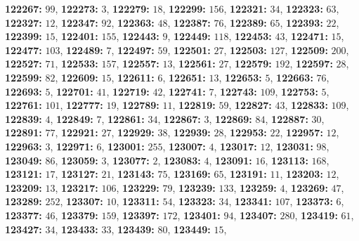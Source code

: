 \textsf{\bfseries 122267:} $99$, \textsf{\bfseries 122273:} $3$, \textsf{\bfseries 122279:} $18$, \textsf{\bfseries 122299:} $156$, \textsf{\bfseries 122321:} $34$, \textsf{\bfseries 122323:} $63$, \textsf{\bfseries 122327:} $12$, \textsf{\bfseries 122347:} $92$, \textsf{\bfseries 122363:} $48$, \textsf{\bfseries 122387:} $76$, \textsf{\bfseries 122389:} $65$, \textsf{\bfseries 122393:} $22$, \textsf{\bfseries 122399:} $15$, \textsf{\bfseries 122401:} $155$, \textsf{\bfseries 122443:} $9$, \textsf{\bfseries 122449:} $118$, \textsf{\bfseries 122453:} $43$, \textsf{\bfseries 122471:} $15$, \textsf{\bfseries 122477:} $103$, \textsf{\bfseries 122489:} $7$, \textsf{\bfseries 122497:} $59$, \textsf{\bfseries 122501:} $27$, \textsf{\bfseries 122503:} $127$, \textsf{\bfseries 122509:} $200$, \textsf{\bfseries 122527:} $71$, \textsf{\bfseries 122533:} $157$, \textsf{\bfseries 122557:} $13$, \textsf{\bfseries 122561:} $27$, \textsf{\bfseries 122579:} $192$, \textsf{\bfseries 122597:} $28$, \textsf{\bfseries 122599:} $82$, \textsf{\bfseries 122609:} $15$, \textsf{\bfseries 122611:} $6$, \textsf{\bfseries 122651:} $13$, \textsf{\bfseries 122653:} $5$, \textsf{\bfseries 122663:} $76$, \textsf{\bfseries 122693:} $5$, \textsf{\bfseries 122701:} $41$, \textsf{\bfseries 122719:} $42$, \textsf{\bfseries 122741:} $7$, \textsf{\bfseries 122743:} $109$, \textsf{\bfseries 122753:} $5$, \textsf{\bfseries 122761:} $101$, \textsf{\bfseries 122777:} $19$, \textsf{\bfseries 122789:} $11$, \textsf{\bfseries 122819:} $59$, \textsf{\bfseries 122827:} $43$, \textsf{\bfseries 122833:} $109$, \textsf{\bfseries 122839:} $4$, \textsf{\bfseries 122849:} $7$, \textsf{\bfseries 122861:} $34$, \textsf{\bfseries 122867:} $3$, \textsf{\bfseries 122869:} $84$, \textsf{\bfseries 122887:} $30$, \textsf{\bfseries 122891:} $77$, \textsf{\bfseries 122921:} $27$, \textsf{\bfseries 122929:} $38$, \textsf{\bfseries 122939:} $28$, \textsf{\bfseries 122953:} $22$, \textsf{\bfseries 122957:} $12$, \textsf{\bfseries 122963:} $3$, \textsf{\bfseries 122971:} $6$, \textsf{\bfseries 123001:} $255$, \textsf{\bfseries 123007:} $4$, \textsf{\bfseries 123017:} $12$, \textsf{\bfseries 123031:} $98$, \textsf{\bfseries 123049:} $86$, \textsf{\bfseries 123059:} $3$, \textsf{\bfseries 123077:} $2$, \textsf{\bfseries 123083:} $4$, \textsf{\bfseries 123091:} $16$, \textsf{\bfseries 123113:} $168$, \textsf{\bfseries 123121:} $17$, \textsf{\bfseries 123127:} $21$, \textsf{\bfseries 123143:} $75$, \textsf{\bfseries 123169:} $65$, \textsf{\bfseries 123191:} $11$, \textsf{\bfseries 123203:} $12$, \textsf{\bfseries 123209:} $13$, \textsf{\bfseries 123217:} $106$, \textsf{\bfseries 123229:} $79$, \textsf{\bfseries 123239:} $133$, \textsf{\bfseries 123259:} $4$, \textsf{\bfseries 123269:} $47$, \textsf{\bfseries 123289:} $252$, \textsf{\bfseries 123307:} $10$, \textsf{\bfseries 123311:} $54$, \textsf{\bfseries 123323:} $34$, \textsf{\bfseries 123341:} $107$, \textsf{\bfseries 123373:} $6$, \textsf{\bfseries 123377:} $46$, \textsf{\bfseries 123379:} $159$, \textsf{\bfseries 123397:} $172$, \textsf{\bfseries 123401:} $94$, \textsf{\bfseries 123407:} $280$, \textsf{\bfseries 123419:} $61$, \textsf{\bfseries 123427:} $34$, \textsf{\bfseries 123433:} $33$, \textsf{\bfseries 123439:} $80$, \textsf{\bfseries 123449:} $15$, 
